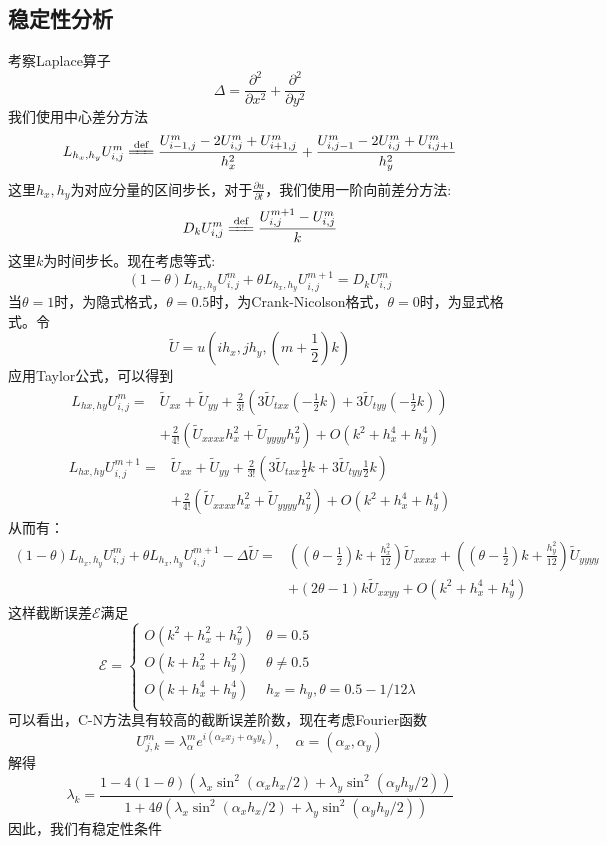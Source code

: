 \documentclass[12pt]{ctexart}
\newcommand{\eqdef}{\xlongequal{\text{def}}}%
\begin{document}
\subsection{稳定性分析}
考察Laplace算子$$\Delta = \frac{\partial^2}{\partial x^2} + \frac{\partial^2}{\partial y^2}$$
\noindent 我们使用中心差分方法
$$
L_{h_x,h_y}U_{i,j}^m \eqdef \frac{U_{i-1,j}^m-2U_{i,j}^m+U_{i+1,j}^m}{h_x^2} + \frac{U_{i,j-1}^m-2U_{i,j}^m+U_{i,j+1}^m}{h_y^2}
$$
\noindent
这里$h_x,h_y$为对应分量的区间步长，对于$\frac{\partial u}{\partial t}$，\noindent 我们使用一阶向前差分方法:
$$
D_k U_{i,j}^m \eqdef \frac{U_{i,j}^{m+1}-U_{i,j}^m}{k}
$$
这里$k$为时间步长。现在考虑等式:
$$
(1-\theta)L_{h_x,h_y}U_{i,j}^m+\theta L_{h_x,h_y}U_{i,j}^{m+1} = D_kU_{i,j}^m
$$
当$\theta = 1$时，为隐式格式，$\theta=0.5$时，为Crank-Nicolson格式，$\theta=0$时，为显式格式。令
$$\tilde{U} = u\left(ih_x,jh_y,\left(m+\frac{1}{2}\right)k\right)$$
应用Taylor公式，可以得到
$$
\begin{aligned}
L_{hx,hy}U_{i,j}^m =& \tilde{U}_{xx} + \tilde{U}_{yy} + \frac{2}{3!}\left(3\tilde{U}_{txx}\left(-\frac{1}{2}k\right)+3\tilde{U}_{tyy}\left(-\frac{1}{2}k\right)\right) \\
&+\frac{2}{4!}\left(\tilde{U}_{xxxx}h_x^2+\tilde{U}_{yyyy}h_y^2\right)+O(k^2+h_x^4+h_y^4)
\end{aligned}
$$
$$
\begin{aligned}
L_{hx,hy}U_{i,j}^{m+1} =& \tilde{U}_{xx} + \tilde{U}_{yy} + \frac{2}{3!}\left(3\tilde{U}_{txx}\frac{1}{2}k+3\tilde{U}_{tyy}\frac{1}{2}k\right) \\
&+\frac{2}{4!}\left(\tilde{U}_{xxxx}h_x^2+\tilde{U}_{yyyy}h_y^2\right)+O(k^2+h_x^4+h_y^4)
\end{aligned}
$$
从而有：
$$
\begin{aligned}
(1-\theta)L_{h_x,h_y}U_{i,j}^m+\theta L_{h_x,h_y}U_{i,j}^{m+1} - \Delta \tilde{U} =& \left(\left(\theta - \frac{1}{2}\right)k+\frac{h_x^2}{12}\right)\tilde{U}_{xxxx}+\left(\left(\theta - \frac{1}{2}\right)k+\frac{h_y^2}{12}\right)\tilde{U}_{yyyy}\\
&+\left(2\theta - 1\right)k\tilde{U}_{xxyy} + O(k^2+h_x^4+h_y^4)
\end{aligned}
$$
\noindent
这样截断误差$\mathcal{E}$满足
$$
\mathcal{E} = 
\begin{cases}
O(k^2+h_x^2+h_y^2) & \theta = 0.5\\
O(k+h_x^2+h_y^2) & \theta \neq 0.5\\
O(k+h_x^4+h_y^4) & h_x = h_y,\theta = 0.5-1/12\lambda \\
\end{cases}
$$
可以看出，C-N方法具有较高的截断误差阶数，现在考虑Fourier函数
$$U_{j,k}^m =\lambda_{\alpha}^me^{i(\alpha_xx_j+\alpha_yy_k)},\quad \alpha = (\alpha_x, \alpha_y)$$
解得
$$
\lambda_k = \frac{1 - 4(1-\theta)\left(\lambda_x\sin^2(\alpha_xh_x/2)+\lambda_y\sin^2(\alpha_yh_y/2)\right)}{1+4\theta\left(\lambda_x\sin^2(\alpha_xh_x/2)+\lambda_y\sin^2(\alpha_yh_y/2)\right)}
$$
因此，我们有稳定性条件
\end{document}
